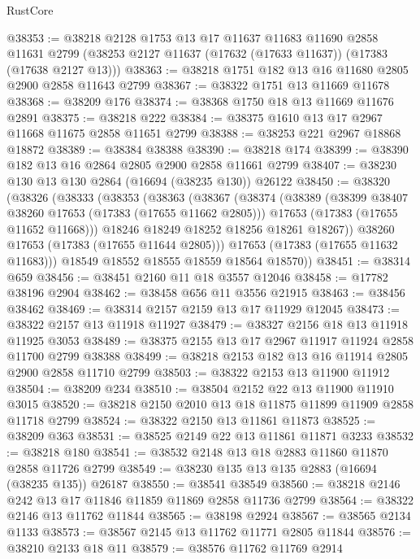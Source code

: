 \begin{lexlean}{RustCore}
\begin{coremodule}
@38353 := @38218
    @2128
    @1753
    @13
    @17
    @11637
    @11683
    @11690
    @2858
    @11631
    @2799
    (@38253 @2127 @11637 (@17632 (@17633 @11637)) (@17383 (@17638 @2127 @13)))
@38363 := @38218 @1751 @182 @13 @16 @11680 @2805 @2900 @2858 @11643 @2799
@38367 := @38322 @1751 @13 @11669 @11678
@38368 := @38209 @176
@38374 := @38368 @1750 @18 @13 @11669 @11676 @2891
@38375 := @38218 @222
@38384 := @38375 @1610 @13 @17 @2967 @11668 @11675 @2858 @11651 @2799
@38388 := @38253 @221 @2967 @18868 @18872
@38389 := @38384 @38388
@38390 := @38218 @174
@38399 := @38390 @182 @13 @16 @2864 @2805 @2900 @2858 @11661 @2799
@38407 := @38230 @130 @13 @130 @2864 (@16694 (@38235 @130)) @26122
@38450 := @38320
    (@38326
      (@38333
        (@38353
          (@38363
            (@38367
              (@38374
                (@38389
                  (@38399 @38407 @38260 @17653 (@17383 (@17655 @11662 @2805)))
                  @17653
                  (@17383 (@17655 @11652 @11668)))
                @18246
                @18249
                @18252
                @18256
                @18261
                @18267))
            @38260
            @17653
            (@17383 (@17655 @11644 @2805)))
          @17653
          (@17383 (@17655 @11632 @11683)))
        @18549
        @18552
        @18555
        @18559
        @18564
        @18570))
@38451 := @38314 @659
@38456 := @38451 @2160 @11 @18 @3557 @12046
@38458 := @17782 @38196 @2904
@38462 := @38458 @656 @11 @3556 @21915
@38463 := @38456 @38462
@38469 := @38314 @2157 @2159 @13 @17 @11929 @12045
@38473 := @38322 @2157 @13 @11918 @11927
@38479 := @38327 @2156 @18 @13 @11918 @11925 @3053
@38489 := @38375 @2155 @13 @17 @2967 @11917 @11924 @2858 @11700 @2799 @38388
@38499 := @38218 @2153 @182 @13 @16 @11914 @2805 @2900 @2858 @11710 @2799
@38503 := @38322 @2153 @13 @11900 @11912
@38504 := @38209 @234
@38510 := @38504 @2152 @22 @13 @11900 @11910 @3015
@38520 := @38218 @2150 @2010 @13 @18 @11875 @11899 @11909 @2858 @11718 @2799
@38524 := @38322 @2150 @13 @11861 @11873
@38525 := @38209 @363
@38531 := @38525 @2149 @22 @13 @11861 @11871 @3233
@38532 := @38218 @180
@38541 := @38532 @2148 @13 @18 @2883 @11860 @11870 @2858 @11726 @2799
@38549 := @38230 @135 @13 @135 @2883 (@16694 (@38235 @135)) @26187
@38550 := @38541 @38549
@38560 := @38218 @2146 @242 @13 @17 @11846 @11859 @11869 @2858 @11736 @2799
@38564 := @38322 @2146 @13 @11762 @11844
@38565 := @38198 @2924
@38567 := @38565 @2134 @1133
@38573 := @38567 @2145 @13 @11762 @11771 @2805 @11844
@38576 := @38210 @2133 @18 @11
@38579 := @38576 @11762 @11769 @2914

\end{coremodule}
\end{lexlean}
